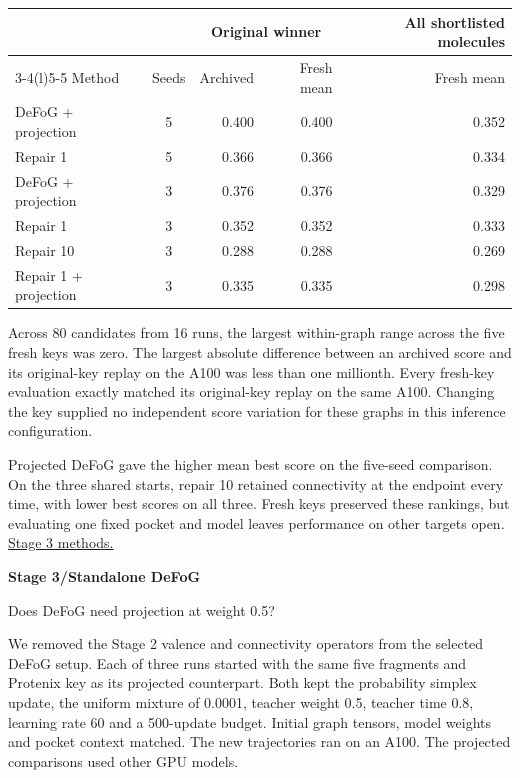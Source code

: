 \documentclass[11pt,a4paper]{article}
\newcommand{\topic}[1]{{\sffamily\bfseries\small\color{guide}#1\par}\vspace{2pt}}
\newcommand{\heading}[1]{{\raggedright\fontsize{25}{28}\selectfont #1\par}\vspace{4pt}}
\newcommand{\footlink}[2]{\href{#1}{#2}}
\begin{document}
\begin{center}\small\sffamily
\begin{tabular*}{.97\linewidth}{@{\extracolsep{\fill}}lcrrr@{}}
\toprule
& & \multicolumn{2}{c}{Original winner} & All shortlisted molecules\\
\cmidrule(lr){3-4}\cmidrule(l){5-5}
Method & Seeds & Archived & Fresh mean & Fresh mean\\
\midrule
DeFoG + projection & 5 & 0.400 & 0.400 & 0.352\\
Repair 1 & 5 & 0.366 & 0.366 & 0.334\\
\addlinespace
DeFoG + projection & 3 & 0.376 & 0.376 & 0.329\\
Repair 1 & 3 & 0.352 & 0.352 & 0.333\\
Repair 10 & 3 & 0.288 & 0.288 & 0.269\\
Repair 1 + projection & 3 & 0.335 & 0.335 & 0.298\\
\bottomrule\end{tabular*}\end{center}
Across 80 candidates from 16 runs, the largest within-graph range across the five fresh keys was zero. The largest absolute difference between an archived score and its original-key replay on the A100 was less than one millionth. Every fresh-key evaluation exactly matched its original-key replay on the same A100. Changing the key supplied no independent score variation for these graphs in this inference configuration.

Projected DeFoG gave the higher mean best score on the five-seed comparison. On the three shared starts, repair 10 retained connectivity at the endpoint every time, with lower best scores on all three. Fresh keys preserved these rankings, but evaluating one fixed pocket and model leaves performance on other targets open. \footlink{https://github.com/NikolajHJ/mosaic/blob/e1b57fc2cab68e17a39c366aa3fbb8c21a0ff2a9/docs/defog_status_2026-11-19/agent_reference.md}{Stage 3 methods.}
\newpage
\topic{Stage 3\enspace/\enspace Standalone DeFoG}
\heading{Does DeFoG need projection at weight 0.5?}
\label{lastreportpage}
We removed the Stage 2 valence and connectivity operators from the selected DeFoG setup. Each of three runs started with the same five fragments and Protenix key as its projected counterpart. Both kept the probability simplex update, the uniform mixture of 0.0001, teacher weight 0.5, teacher time 0.8, learning rate 60 and a 500-update budget. Initial graph tensors, model weights and pocket context matched. The new trajectories ran on an A100. The projected comparisons used other GPU models.
\end{document}
